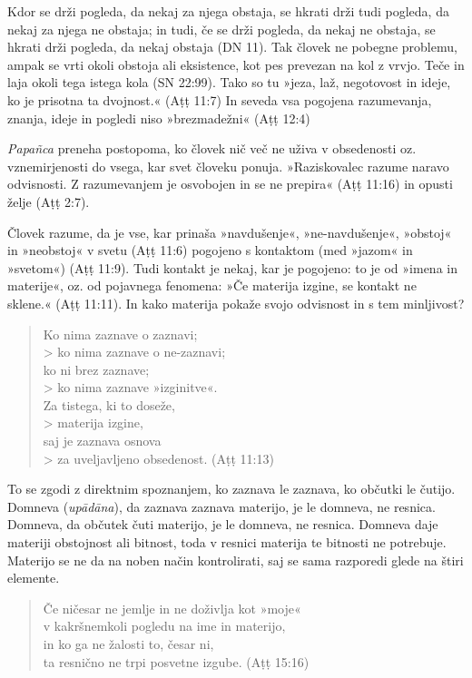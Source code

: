 Kdor se drži pogleda, da nekaj za njega obstaja, se hkrati drži tudi
pogleda, da nekaj za njega ne obstaja; in tudi, če se drži pogleda, da
nekaj ne obstaja, se hkrati drži pogleda, da nekaj obstaja (DN 11). Tak
človek ne pobegne problemu, ampak se vrti okoli obstoja ali eksistence,
kot pes prevezan na kol z vrvjo. Teče in laja okoli tega istega kola (SN
22:99). Tako so tu »jeza, laž, negotovost in ideje, ko je prisotna ta
dvojnost.« (Aṭṭ 11:7) In seveda vsa pogojena razumevanja, znanja, ideje
in pogledi niso »brezmadežni« (Aṭṭ 12:4)

\emph{Papañca} preneha postopoma, ko človek nič več ne uživa v
obsedenosti oz. vznemirjenosti do vsega, kar svet človeku ponuja.
»Raziskovalec razume naravo odvisnosti. Z razumevanjem je osvobojen in
se ne prepira« (Aṭṭ 11:16) in opusti želje (Aṭṭ 2:7).

Človek razume, da je vse, kar prinaša »navdušenje«, »ne-navdušenje«,
»obstoj« in »neobstoj« v svetu (Aṭṭ 11:6) pogojeno s kontaktom (med
»jazom« in »svetom«) (Aṭṭ 11:9). Tudi kontakt je nekaj, kar je pogojeno:
to je od »imena in materije«, oz. od pojavnega fenomena: »Če materija
izgine, se kontakt ne sklene.« (Aṭṭ 11:11). In kako materija pokaže
svojo odvisnost in s tem minljivost?
\label{vednostjo-end}

\begin{verse}
Ko nima zaznave o zaznavi;\\> ko nima zaznave o ne-zaznavi;\\
ko ni brez zaznave;\\> ko nima zaznave »izginitve«.\\
Za tistega, ki to doseže,\\> materija izgine,\\
saj je zaznava osnova\\> za uveljavljeno obsedenost. (Aṭṭ 11:13)
\end{verse}

To se zgodi z direktnim spoznanjem, ko zaznava le zaznava, ko občutki le
čutijo. Domneva (\emph{upādāna}), da zaznava zaznava materijo, je le
domneva, ne resnica. Domneva, da občutek čuti materijo, je le domneva,
ne resnica. Domneva daje materiji obstojnost ali bitnost, toda v resnici
materija te bitnosti ne potrebuje. Materijo se ne da na noben način
kontrolirati, saj se sama razporedi glede na štiri elemente.

\begin{verse}
Če ničesar ne jemlje in ne doživlja kot »moje«\\
v kakršnemkoli pogledu na ime in materijo,\\
in ko ga ne žalosti to, česar ni,\\
ta resnično ne trpi posvetne izgube. (Aṭṭ 15:16)
\end{verse}


